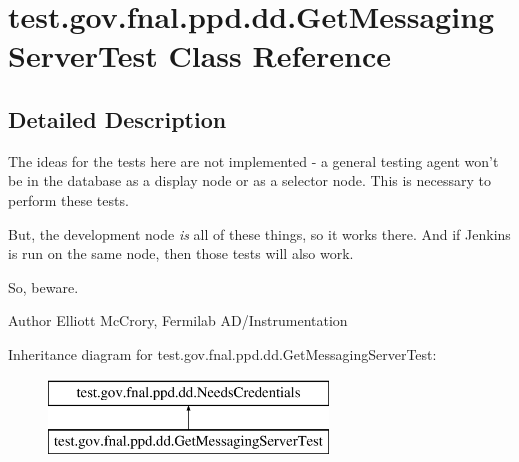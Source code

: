 \hypertarget{classtest_1_1gov_1_1fnal_1_1ppd_1_1dd_1_1GetMessagingServerTest}{\section{test.\-gov.\-fnal.\-ppd.\-dd.\-Get\-Messaging\-Server\-Test Class Reference}
\label{classtest_1_1gov_1_1fnal_1_1ppd_1_1dd_1_1GetMessagingServerTest}
}


\subsection{Detailed Description}
The ideas for the tests here are not implemented -\/ a general testing agent won't be in the database as a display node or as a selector node. This is necessary to perform these tests.

But, the development node {\itshape is} all of these things, so it works there. And if Jenkins is run on the same node, then those tests will also work.

So, beware.

\begin{DoxyAuthor}{Author}
Elliott Mc\-Crory, Fermilab A\-D/\-Instrumentation 
\end{DoxyAuthor}
Inheritance diagram for test.\-gov.\-fnal.\-ppd.\-dd.\-Get\-Messaging\-Server\-Test\-:\begin{figure}[H]
\begin{center}
\leavevmode
\includegraphics[height=2.000000cm]{classtest_1_1gov_1_1fnal_1_1ppd_1_1dd_1_1GetMessagingServerTest}
\end{center}
\end{figure}
